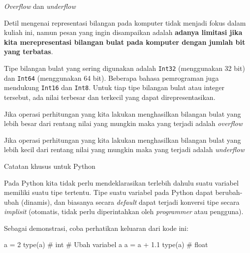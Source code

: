 \begin{frame}{\textit{Overflow} dan \textit{underflow}}

Detil mengenai representasi bilangan pada komputer tidak menjadi fokus dalam
kuliah ini, namun pesan yang ingin disampaikan adalah \textbf{adanya
limitasi jika kita merepresentasi bilangan bulat pada komputer dengan
jumlah bit yang terbatas}.

Tipe bilangan bulat yang sering digunakan adalah \texttt{Int32} (menggunakan
32 bit) dan \texttt{Int64} (menggunakan 64 bit). Beberapa bahasa pemrograman juga
mendukung \texttt{Int16} dan \texttt{Int8}.
Untuk tiap tipe bilangan bulat atau integer tersebut, ada nilai terbesar
dan terkecil yang dapat direpresentasikan.

Jika operasi perhitungan yang kita lakukan menghasilkan
bilangan bulat yang lebih besar dari rentang nilai yang mungkin
maka yang terjadi adalah \textit{overflow}

Jika operasi perhitungan yang kita lakukan menghasilkan
bilangan bulat yang lebih kecil dari rentang nilai yang mungkin
maka yang terjadi adalah \textit{underflow}

\end{frame}




\begin{frame}[fragile]{Catatan khusus untuk Python}

Pada Python kita tidak perlu mendeklarasikan terlebih dahulu suatu variabel memiliki
suatu tipe tertentu. Tipe suatu variabel pada Python dapat berubah-ubah (dinamis), dan
biasanya secara \textit{default} dapat terjadi konversi tipe secara \textit{implisit} (otomatis, tidak
perlu diperintahkan oleh \textit{programmer} atau pengguna).

Sebagai demonstrasi, coba perhatikan keluaran dari kode ini:
\begin{pythoncode}
a = 2
type(a) # int
# Ubah variabel a
a = a + 1.1
type(a) # float
\end{pythoncode}

\end{frame}




